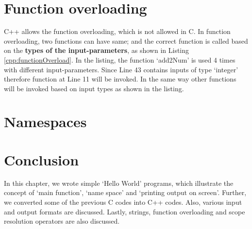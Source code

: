 

\section{Function overloading}
C++ allows the function overloading, which is not allowed in C. In function overloading, two functions can have same; and the correct function is called based on the \textbf{types of the input-parameters}, as shown in Listing \ref{cpp:functionOverload}. In the listing, the function `add2Num' is used 4 times with different input-parameters. Since Line 43 contains inputs of type `integer' therefore function at Line 11 will be invoked. In the same way other functions will be invoked based on input types as shown in the listing. 
 




\section{Namespaces}





\section{Conclusion}
In this chapter, we wrote simple `Hello World' programs, which illustrate the concept of `main function', `name space' and `printing output on screen'. Further, we converted some of the previous C codes into C++ codes. Also, various input and output formats are discussed. Lastly, strings, function overloading and scope resolution operators are also discussed. 
